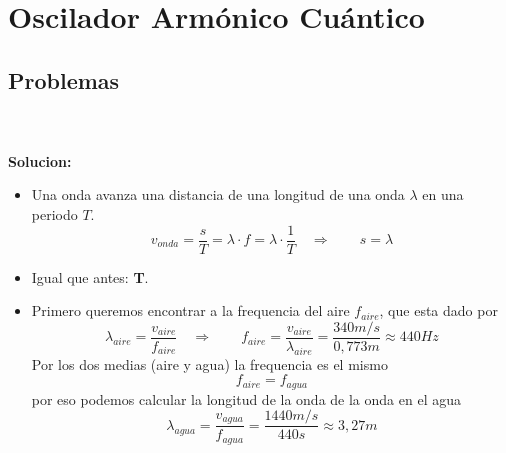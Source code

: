 \chapter{Oscilador Armónico Cuántico}

\section{Problemas}

 \\\\
\textbf{Solucion:} \\
\begin{itemize}
	\item Una onda avanza una distancia de una longitud de una onda
\textbf{$\lambda$} en una periodo \textbf{$T$}. 
	$$
		v_{onda} = \frac{s}{T} = \lambda \cdot f = \lambda \cdot \frac{1}{T}  \quad
\Rightarrow \qquad s = \lambda
	$$
	\item Igual que antes: \textbf{T}.
	\item Primero queremos encontrar a la frequencia del aire $f_{aire}$, que
esta dado por
	$$
		\lambda_{aire} = \frac{v_{aire}}{f_{aire}} \quad \Rightarrow \qquad f_{aire} =
\frac{v_{aire}}{\lambda_{aire}} = \frac{340 m/s}{0,773m} \approx 440 Hz
	$$
	Por los dos medias (aire y agua) la frequencia es el mismo
	$$
		f_{aire} = f_{agua}
	$$
	por eso podemos calcular la longitud de la onda de la onda en el agua
	$$
		\lambda_{agua} = \frac{v_{agua}}{f_{agua}} = \frac{1440 m/s}{440 s}
\approx 3,27 m
	$$
\end{itemize}






